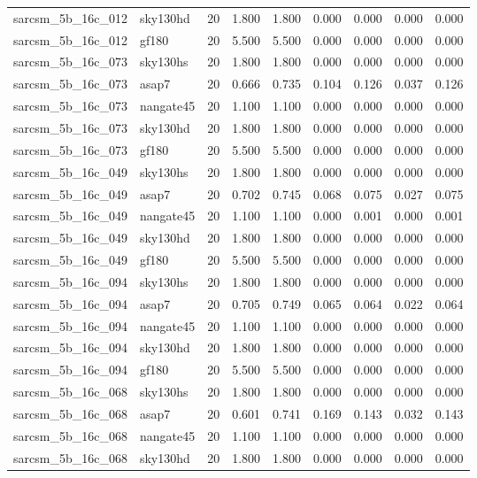 \begin{tabular}{llrrrrrrr}
sarcsm\_5b\_16c\_012 & sky130hd & 20 & 1.800 & 1.800 & 0.000 & 0.000 & 0.000 & 0.000 \\
sarcsm\_5b\_16c\_012 & gf180 & 20 & 5.500 & 5.500 & 0.000 & 0.000 & 0.000 & 0.000 \\
sarcsm\_5b\_16c\_073 & sky130hs & 20 & 1.800 & 1.800 & 0.000 & 0.000 & 0.000 & 0.000 \\
sarcsm\_5b\_16c\_073 & asap7 & 20 & 0.666 & 0.735 & 0.104 & 0.126 & 0.037 & 0.126 \\
sarcsm\_5b\_16c\_073 & nangate45 & 20 & 1.100 & 1.100 & 0.000 & 0.000 & 0.000 & 0.000 \\
sarcsm\_5b\_16c\_073 & sky130hd & 20 & 1.800 & 1.800 & 0.000 & 0.000 & 0.000 & 0.000 \\
sarcsm\_5b\_16c\_073 & gf180 & 20 & 5.500 & 5.500 & 0.000 & 0.000 & 0.000 & 0.000 \\
sarcsm\_5b\_16c\_049 & sky130hs & 20 & 1.800 & 1.800 & 0.000 & 0.000 & 0.000 & 0.000 \\
sarcsm\_5b\_16c\_049 & asap7 & 20 & 0.702 & 0.745 & 0.068 & 0.075 & 0.027 & 0.075 \\
sarcsm\_5b\_16c\_049 & nangate45 & 20 & 1.100 & 1.100 & 0.000 & 0.001 & 0.000 & 0.001 \\
sarcsm\_5b\_16c\_049 & sky130hd & 20 & 1.800 & 1.800 & 0.000 & 0.000 & 0.000 & 0.000 \\
sarcsm\_5b\_16c\_049 & gf180 & 20 & 5.500 & 5.500 & 0.000 & 0.000 & 0.000 & 0.000 \\
sarcsm\_5b\_16c\_094 & sky130hs & 20 & 1.800 & 1.800 & 0.000 & 0.000 & 0.000 & 0.000 \\
sarcsm\_5b\_16c\_094 & asap7 & 20 & 0.705 & 0.749 & 0.065 & 0.064 & 0.022 & 0.064 \\
sarcsm\_5b\_16c\_094 & nangate45 & 20 & 1.100 & 1.100 & 0.000 & 0.000 & 0.000 & 0.000 \\
sarcsm\_5b\_16c\_094 & sky130hd & 20 & 1.800 & 1.800 & 0.000 & 0.000 & 0.000 & 0.000 \\
sarcsm\_5b\_16c\_094 & gf180 & 20 & 5.500 & 5.500 & 0.000 & 0.000 & 0.000 & 0.000 \\
sarcsm\_5b\_16c\_068 & sky130hs & 20 & 1.800 & 1.800 & 0.000 & 0.000 & 0.000 & 0.000 \\
sarcsm\_5b\_16c\_068 & asap7 & 20 & 0.601 & 0.741 & 0.169 & 0.143 & 0.032 & 0.143 \\
sarcsm\_5b\_16c\_068 & nangate45 & 20 & 1.100 & 1.100 & 0.000 & 0.000 & 0.000 & 0.000 \\
sarcsm\_5b\_16c\_068 & sky130hd & 20 & 1.800 & 1.800 & 0.000 & 0.000 & 0.000 & 0.000 \\

\end{tabular}
